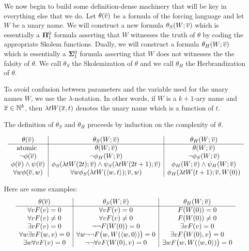 We now begin to build some definition-dense machinery that will be key
in everything else that we do.
Let $\theta(\overline{v})$ be a formula of the forcing language and
let $W$ be a unary name.
We will construct a new formula $\theta_S(W;\overline{v})$ which
is essentially a $\mathbf{\Pi}^0_1$ formula asserting that $W$ witnesses the truth of $\theta$
by coding the appropriate Skolem functions.
Dually, we will construct a formula $\theta_H(W;\overline{v})$ which
is essentially a $\mathbf{\Sigma}^0_1$ formula asserting that $W$ does not witnesses
the the falsity of $\theta$.
We call $\theta_S$ the Skolemization of $\theta$ and
we call $\theta_H$ the Herbrandization of $\theta$.

To avoid confusion between parameters and the variable used for the
unary names $W$, we use the $\lambda$-notation.
In other words, if $W$ is a $k+1$-ary name and $\overline{x}\in\mathbb{N}^k$,
then $\lambda tW(\overline{x},t)$ denotes the unary name which is a function of $t$.

The definition of $\theta_S$ and $\theta_H$
proceeds by induction on the complexity of $\theta$.

$$
\begin{array}{c|c|c}

\theta(\tup{v}) & \theta_S(W;\tup{v}) & \theta_H(W;\tup{v})\\
\hline
\text{atomic } & \theta(W;\tup{v}) & \theta(W;\tup{v})\\

\neg\phi(\tup{v}) & \neg\phi_H(W;\tup{v}) & \neg\phi_S(W;\tup{v})\\

\phi(\tup{v})\land\psi(\tup{v}) & \phi_S(\lambda tW(2t);\tup{v})\land\psi_S(\lambda tW(2t+1);\tup{v})
	&\phi_H(W;\tup{v})\land\psi_H(W;\tup{v})\\

\forall w\phi(\tup{v},w) & \forall w\phi_S(\lambda tW(\langle w,t\rangle);\tup{v},w)
	& \phi_H(\lambda tW(t+1);\tup{v},W(0))\\

\end{array}
$$

Here are some examples:
$$
\begin{array}{c|c|c}

\theta(\tup{v}) & \theta_S(W;\tup{v}) & \theta_H(W;\tup{v})\\
\hline
\forall v F(v)=0 & \forall v F(v)=0 & F(W(0))=0 \\
\forall v F(v)\neq 0 & \forall v F(v)\neq 0 & F(W(0))\neq 0 \\
\exists v F(v)=0 & \neg\neg F(W(0))=0 & \exists v F(v)=0 \\
\forall w\exists v F(w,v)=0 & \forall w \neg\neg F\big(w,W(\seq{w,0})\big)=0  &
	\exists v F\big(W(0),v\big)=0\\
\exists w\forall v F(v)=0 & \neg\neg\forall vF(W(0),v)=0 &
	\exists w F\big(w,W(\seq{w,0})\big)=0\\
\end{array}
$$

